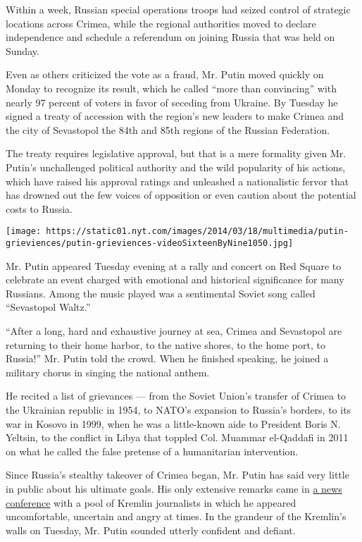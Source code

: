 Within a week, Russian special operations troops had seized control of
strategic locations across Crimea, while the regional authorities moved
to declare independence and schedule a referendum on joining Russia that
was held on Sunday.

Even as others criticized the vote as a fraud, Mr. Putin moved quickly
on Monday to recognize its result, which he called ``more than
convincing'' with nearly 97 percent of voters in favor of seceding from
Ukraine. By Tuesday he signed a treaty of accession with the region's
new leaders to make Crimea and the city of Sevastopol the 84th and 85th
regions of the Russian Federation.

The treaty requires legislative approval, but that is a mere formality
given Mr. Putin's unchallenged political authority and the wild
popularity of his actions, which have raised his approval ratings and
unleashed a nationalistic fervor that has drowned out the few voices of
opposition or even caution about the potential costs to Russia.

\texttt{[image: https://static01.nyt.com/images/2014/03/18/multimedia/putin-grieviences/putin-grieviences-videoSixteenByNine1050.jpg]}

Mr. Putin appeared Tuesday evening at a rally and concert on Red Square
to celebrate an event charged with emotional and historical significance
for many Russians. Among the music played was a sentimental Soviet song
called ``Sevastopol Waltz.''

``After a long, hard and exhaustive journey at sea, Crimea and
Sevastopol are returning to their home harbor, to the native shores, to
the home port, to Russia!'' Mr. Putin told the crowd. When he finished
speaking, he joined a military chorus in singing the national anthem.

He recited a list of grievances --- from the Soviet Union's transfer of
Crimea to the Ukrainian republic in 1954, to NATO's expansion to
Russia's borders, to its war in Kosovo in 1999, when he was a
little-known aide to President Boris N. Yeltsin, to the conflict in
Libya that toppled Col. Muammar el-Qaddafi in 2011 on what he called the
false pretense of a humanitarian intervention.

Since Russia's stealthy takeover of Crimea began, Mr. Putin has said
very little in public about his ultimate goals. His only extensive
remarks came in
\href{http://www.nytimes.com/2014/03/05/world/europe/putin-flashing-disdain-defends-action-in-crimea.html}{a
news conference} with a pool of Kremlin journalists in which he appeared
uncomfortable, uncertain and angry at times. In the grandeur of the
Kremlin's walls on Tuesday, Mr. Putin sounded utterly confident and
defiant.

